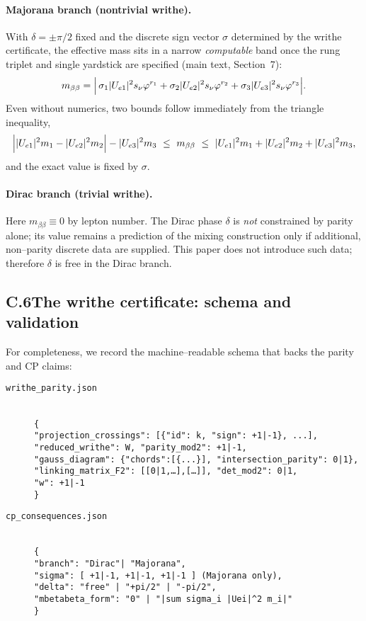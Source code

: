 \documentclass[11pt]{article}
\begin{document}
\paragraph{Majorana branch (nontrivial writhe).}
With $\delta=\pm\pi/2$ fixed and the discrete sign vector $\sigma$ determined by the writhe certificate, the effective mass sits in a narrow \emph{computable} band once the rung triplet and single yardstick are specified (main text, Section~7):
\[
m_{\beta\beta}
=\Bigl|\,\sigma_1|U_{e1}|^2 s_\nu\varphi^{r_1}+\sigma_2|U_{e2}|^2 s_\nu\varphi^{r_2}
+\sigma_3|U_{e3}|^2 s_\nu\varphi^{r_3}\Bigr|.
\]
Even without numerics, two bounds follow immediately from the triangle inequality,
\[
\Bigl||U_{e1}|^2m_1-|U_{e2}|^2m_2\Bigr|-|U_{e3}|^2m_3
\ \le\ m_{\beta\beta}\ \le\
|U_{e1}|^2m_1+|U_{e2}|^2m_2+|U_{e3}|^2m_3,
\]
and the exact value is fixed by $\sigma$.

\paragraph{Dirac branch (trivial writhe).}
Here $m_{\beta\beta}\equiv 0$ by lepton number. The Dirac phase $\delta$ is \emph{not} constrained by parity alone; its value remains a prediction of the mixing construction only if additional, non–parity discrete data are supplied. This paper does not introduce such data; therefore $\delta$ is free in the Dirac branch.

\subsection*{C.6\quad The writhe certificate: schema and validation}

For completeness, we record the machine–readable schema that backs the parity and CP claims:

\begin{description}
  \item[\texttt{writhe\_parity.json}] \ \\
  \texttt{\{}\\
  \quad\texttt{"projection\_crossings": [\{"id": k, "sign": +1|-1\}, ...],}\\
  \quad\texttt{"reduced\_writhe": W, "parity\_mod2": +1|-1,}\\
  \quad\texttt{"gauss\_diagram": \{"chords":[\{...\}], "intersection\_parity": 0|1\},}\\
  \quad\texttt{"linking\_matrix\_F2": [[0|1,\dots],[\dots]], "det\_mod2": 0|1,}\\
  \quad\texttt{"w": +1|-1}\\
  \texttt{\}}
  \item[\texttt{cp\_consequences.json}] \ \\
  \texttt{\{}\\
  \quad\texttt{"branch": "Dirac"| "Majorana",}\\
  \quad\texttt{"sigma": [\,+1|-1,\ +1|-1,\ +1|-1\,] (Majorana only),}\\
  \quad\texttt{"delta": "free" | "+pi/2" | "-pi/2",}\\
  \quad\texttt{"mbetabeta\_form": "0" | "|sum sigma\_i |Uei|^2 m\_i|"}\\
  \texttt{\}}
\end{description}
\end{document}
